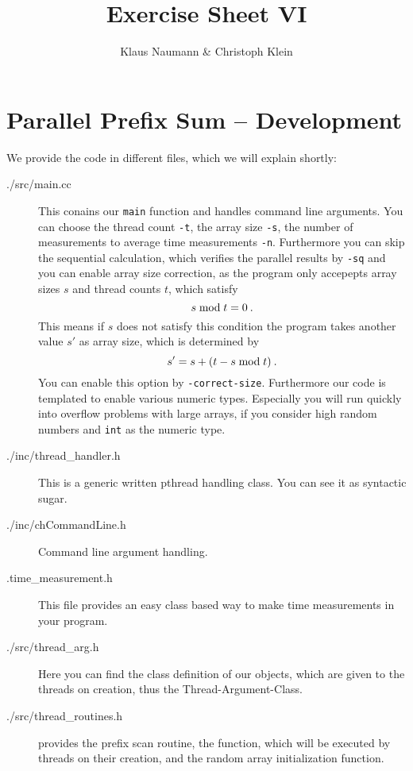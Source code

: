 \documentclass[oneside,a4paper]{scrartcl}
\begin{document}

\title{Exercise Sheet VI}
\subject{Advanced Parallel Computing}
\author{Klaus Naumann \& Christoph Klein}
\maketitle



\section{Parallel Prefix Sum -- Development}
\label{dev}
We provide the code in different files, which we will explain shortly:
\begin{description}
	\item[./src/main.cc] This conains our \texttt{main} function and handles
	command line arguments. You can choose the thread count \texttt{-t},
	the array size \texttt{-s}, the number of measurements to average
	time measurements \texttt{-n}. Furthermore you can skip the 
	sequential calculation, which verifies the parallel results by
	\texttt{-sq} and you can enable array size correction, as the
	program only accepepts array sizes $s$ and thread counts $t$, which
	satisfy
	\[s \;\textnormal{mod}\; t = 0\:.\]
	This means if $s$ does not satisfy this condition the program
	takes another value $s'$ as array size, which is determined by
	\[ s' = s + (t - s\;\textnormal{mod}\; t)\:.\]
	You can enable this option by \texttt{-correct-size}. Furthermore
	our code is templated to enable various numeric types. Especially
	you will run quickly into overflow problems with large arrays, if you
	consider high random numbers and \texttt{int} as the numeric type.
	\item[./inc/thread\_handler.h] This is a generic written
	pthread handling class. You can see it as syntactic sugar.
	\item[./inc/chCommandLine.h] Command line argument handling.
	\item[.time\_measurement.h] This file provides an easy class based way
	to make time measurements in your program.
	\item[./src/thread\_arg.h] Here you can find the class definition of
	our objects, which are given to the threads on creation, thus the
	Thread-Argument-Class.
	\item[./src/thread\_routines.h] provides the prefix scan routine,
	the function, which will be executed by threads on their creation,
	and the random array initialization function.
\end{description}
\end{document}
